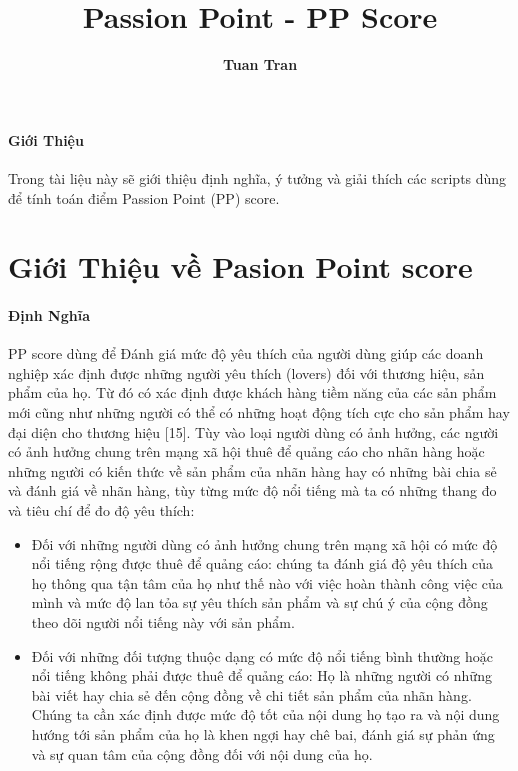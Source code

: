 \documentclass[12pt]{article}
\title{Passion Point - PP Score}
\author{{\bf Tuan Tran}}
\numberwithin{equation}{section}
\begin{document}
\maketitle
\paragraph{Giới Thiệu} Trong tài liệu này sẽ giới thiệu định nghĩa, ý tưởng và giải thích các scripts dùng để tính toán điểm Passion Point (PP) score.

\section{Giới Thiệu về Pasion Point score}

\paragraph{Định Nghĩa} PP score dùng để Đánh giá mức độ yêu thích của người dùng giúp các doanh nghiệp xác định được những người yêu thích (lovers) đối với thương hiệu, sản phẩm của họ. Từ đó có xác định được khách hàng tiềm năng của các sản phẩm mới cũng như những người có thể có những hoạt động tích cực cho sản phẩm hay đại diện cho thương hiệu [15]. Tùy vào loại người dùng có ảnh hưởng, các người có ảnh hưởng chung trên mạng xã hội thuê để quảng cáo cho nhãn hàng hoặc những người có kiến thức về sản phẩm của nhãn hàng hay có những bài chia sẻ và đánh giá về nhãn hàng, tùy từng mức độ nổi tiếng mà ta có những thang đo và tiêu chí để đo độ yêu thích:

\begin{itemize} 

\item Đối với những người dùng có ảnh hưởng chung trên mạng xã hội có mức độ nổi tiếng rộng được thuê để quảng cáo: chúng ta đánh giá độ yêu thích của họ thông qua tận tâm của họ như thế nào với việc hoàn thành công việc của mình và mức độ lan tỏa sự yêu thích sản phẩm và sự chú ý của cộng đồng theo dõi người nổi tiếng này với sản phẩm.


\item Đối với những đối tượng thuộc dạng có mức độ nổi tiếng bình thường hoặc nổi tiếng không phải được thuê để quảng cáo: Họ là những người có những bài viết hay chia sẻ đến cộng đồng về chi tiết sản phẩm của nhãn hàng. Chúng ta cần xác định được mức độ tốt của nội dung họ tạo ra và nội dung hướng tới sản phẩm của họ là khen ngợi hay chê bai, đánh giá sự phản ứng và sự quan tâm của cộng đồng đối với nội dung của họ.

\end{itemize}
\end{document}

